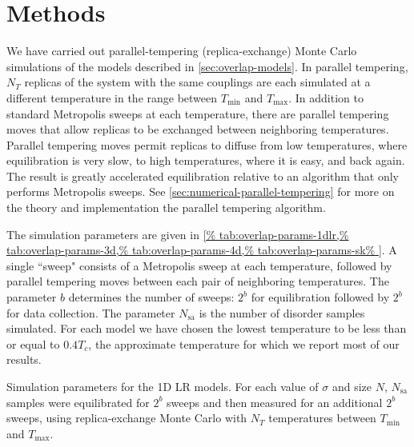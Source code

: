 \section{Methods}

We have carried out parallel-tempering (replica-exchange) Monte Carlo
simulations of the models described in \cref{sec:overlap-models}. In parallel
tempering, $N_T$ replicas of the system with the same couplings are each
simulated at a different temperature in the range between $T_{\mathrm{min}}$
and $T_{\mathrm{max}}$. In addition to standard Metropolis sweeps at each
temperature, there are parallel tempering moves that allow replicas to be
exchanged between neighboring temperatures. Parallel tempering moves permit
replicas to diffuse from low temperatures, where equilibration is very slow, to
high temperatures, where it is easy, and back again. The result is greatly
accelerated equilibration relative to an algorithm that only performs
Metropolis sweeps. See \cref{sec:numerical-parallel-tempering} for more on the
theory and implementation the parallel tempering algorithm.

The simulation parameters are given in
\cref{%
  tab:overlap-params-1dlr,%
  tab:overlap-params-3d,%
  tab:overlap-params-4d,%
  tab:overlap-params-sk%
}.
A single ``sweep" consists of a Metropolis sweep at each temperature, followed
by parallel tempering moves between each pair of neighboring temperatures. The
parameter $b$ determines the number of sweeps: $2^b$ for equilibration followed
by $2^b$ for data collection. The parameter $N_{\mathrm{sa}}$ is the number of
disorder samples simulated.
For each model we have chosen the lowest temperature to be less than or equal
to $0.4 T_c$, the approximate temperature for which we report most of our results.


\begin{table}
  \centering
  \caption [
    Simulation parameters for one-dimensional long-range spin-glass models with
    diluted bonds.
  ]
  {
    Simulation parameters for the 1D LR models. For each value of $\sigma$ and
    size $N$, $N_{\mathrm{sa}}$ samples were equilibrated for $2^b$ sweeps and
    then measured for an additional $2^b$ sweeps, using replica-exchange Monte
    Carlo with $N_T$ temperatures between $T_{\mathrm{min}}$ and
    $T_{\mathrm{max}}$.
  } \label{tab:overlap-params-1dlr}
\end{table}

